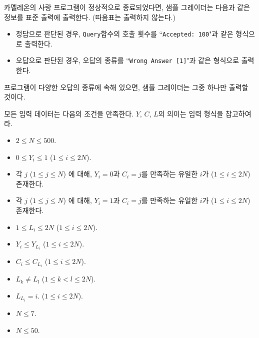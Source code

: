 \begin{problem}{카멜레온의 사랑}
	프로그램이 정상적으로 종료되었다면, 샘플 그레이더는 다음과 같은 정보를 표준 출력에 출력한다. (따옴표는 출력하지 않는다.)
	
	\begin{itemize}
		\item 정답으로 판단된 경우, \texttt{Query}함수의 호출 횟수를 ``\texttt{Accepted: 100}"과 같은 형식으로 출력한다.
		\item 오답으로 판단된 경우, 오답의 종류를 ``\texttt{Wrong Answer [1]}"과 같은 형식으로 출력한다.
	\end{itemize}
	
	프로그램이 다양한 오답의 종류에 속해 있으면, 샘플 그레이더는 그중 하나만 출력할 것이다.
	
	\Constraints
	
	모든 입력 데이터는 다음의 조건을 만족한다. $Y$, $C$, $L$의 의미는 입력 형식을 참고하여라.
	
	\begin{itemize}
		\item $2 \le N \le 500$.
		\item $0 \le Y_i \le 1$ ($1 \le i \le 2N$).
		\item 각 $j$ ($1 \le j \le N$) 에 대해, $Y_i = 0$과 $C_i = j$를 만족하는 유일한 $i$가 ($1 \le i \le 2N$) 존재한다.
		\item 각 $j$ ($1 \le j \le N$) 에 대해, $Y_i = 1$과 $C_i = j$를 만족하는 유일한 $i$가  ($1 \le i \le 2N$) 존재한다.
		\item $1 \le L_i \le 2N$ ($1 \le i \le 2N$).
		\item $Y_i \le Y_{L_i}$ ($1 \le i \le 2N$).
		\item $C_i \le C_{L_i}$ ($1 \le i \le 2N$).
		\item $L_k \ne L_l$ ($1 \le k < l \le 2N$).
	\end{itemize}
	
	\begin{itemize}
		\item $L_{L_i} = i$. ($1 \le i \le 2N$).
	\end{itemize}
	
	\begin{itemize}
		\item $N \le 7$.
	\end{itemize}

	\begin{itemize}
		\item $N \le 50$.
	\end{itemize}


\end{problem}
